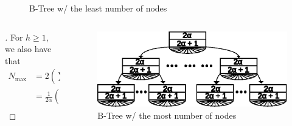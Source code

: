 \documentclass{beamer}
\begin{document}
\begin{frame}
\begin{columns}
\begin{column}{0.5\textwidth}
\begin{figure}
                \caption[]{B-Tree w/ the least number of nodes}
            \end{figure}
        \end{column}
    \end{columns}

    \framebreak

    \begin{columns}
        \begin{column}{0.5\textwidth}
            \begin{block}{}
                \begin{proof}[\unskip\nopunct]\renewcommand{\qedsymbol}{}
                    For \(h \geq 1\), we also have that
                    \[
                        \begin{aligned}
                            N_{\text{max}} &= 2\left(\sum^{h - 1}_{i = 0} \left(2\alpha + 1\right)^i \right) \\
                            &= \frac{1}{2\alpha}\left(\left(2\alpha + 1\right)^{h} - 1\right) \\
                        \end{aligned}
                    \]
                \end{proof}
            \end{block}
        \end{column}
        \begin{column}{0.5\textwidth}
            \begin{figure}
                \includegraphics[width=0.95\linewidth,keepaspectratio]{resources/made/generic_max_btree.eps}
                \caption[]{B-Tree w/ the most number of nodes}
            \end{figure}
        \end{column}
    \end{columns}
    \begin{columns}
        \begin{column}{\textlecolumn}
            \begin{block}{}

\end{block}
\end{column}
\end{columns}
\end{frame}
\end{document}
